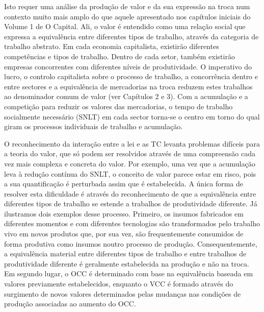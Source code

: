 Isto requer uma análise da produção de valor e da sua expressão na troca num contexto muito mais amplo do que aquele apresentado nos capítulos iniciais do Volume {\color{blue}1} de O Capital. Ali, o valor é entendido como uma relação social que expressa a equivalência entre diferentes tipos de trabalho, através da categoria de trabalho abstrato. Em cada economia capitalista, existirão diferentes competências e tipos de trabalho. Dentro de cada setor, também existirão empresas concorrentes com diferentes níveis de produtividade. O imperativo do lucro, o controlo capitalista sobre o processo de trabalho, a concorrência dentro e entre sectores e a equivalência de mercadorias na troca reduzem estes trabalhos ao denominador comum de valor (ver Capítulos {\color{blue}2} e {\color{blue}3}). Com a acumulação e a competição para reduzir os valores das mercadorias, o tempo de trabalho socialmente necessário (SNLT) em cada sector torna-se o centro em torno do qual giram os processos individuais de trabalho e acumulação.
 \par 
O reconhecimento da interação entre a lei e as TC levanta problemas difíceis para a teoria do valor, que só podem ser resolvidos através de uma compreensão cada vez mais complexa e concreta do valor. Por exemplo, uma vez que a acumulação leva à redução contínua do SNLT, o conceito de valor parece estar em risco, pois a sua quantificação é perturbada assim que é estabelecida. A única forma de resolver esta dificuldade é através do reconhecimento de que a equivalência entre diferentes tipos de trabalho se estende a trabalhos de produtividade diferente. Já ilustramos dois exemplos desse processo. Primeiro, os insumos fabricados em diferentes momentos e com diferentes tecnologias são transformados pelo trabalho vivo em novos produtos que, por sua vez, são frequentemente consumidos de forma produtiva como insumos noutro processo de produção. Consequentemente, a equivalência material entre diferentes tipos de trabalho e entre trabalhos de produtividade diferente é geralmente estabelecida na produção e não na troca. Em segundo lugar, o OCC é determinado com base na equivalência baseada em valores previamente estabelecidos, enquanto o VCC é formado através do surgimento de novos valores determinados pelas mudanças nas condições de produção associadas ao aumento do OCC.
 \par 
